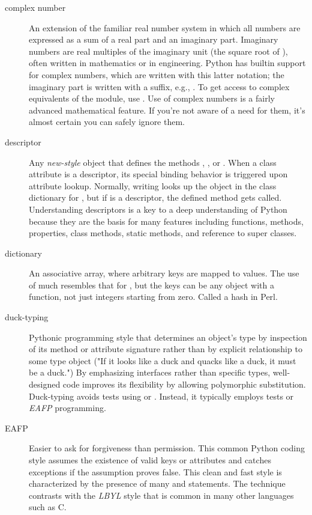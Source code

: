 \begin{description}
\item[complex number]
An extension of the familiar real number system in which all numbers are
expressed as a sum of a real part and an imaginary part.  Imaginary numbers
are real multiples of the imaginary unit (the square root of {}),
often written {} in mathematics or {} in engineering.
Python has builtin support for complex numbers, which are written with this
latter notation; the imaginary part is written with a {} suffix,
e.g., {}.  To get access to complex equivalents of the
{} module, use {}.  Use of complex numbers is a
fairly advanced mathematical feature.  If you're not aware of a need for them,
it's almost certain you can safely ignore them.

\item[descriptor]
Any \emph{new-style} object that defines the methods
{}, , or .
When a class attribute is a descriptor, its special binding behavior
is triggered upon attribute lookup.  Normally, writing  looks
up the object  in the class dictionary for , but if
{} is a descriptor, the defined method gets called.
Understanding descriptors is a key to a deep understanding of Python
because they are the basis for many features including functions,
methods, properties, class methods, static methods, and reference to
super classes.

\item[dictionary]
An associative array, where arbitrary keys are mapped to values.  The
use of  much resembles that for , but the keys
can be any object with a  function, not just
integers starting from zero.  Called a hash in Perl.

\item[duck-typing]
Pythonic programming style that determines an object's type by inspection
of its method or attribute signature rather than by explicit relationship
to some type object ("If it looks like a duck and quacks like a duck, it
must be a duck.")  By emphasizing interfaces rather than specific types,
well-designed code improves its flexibility by allowing polymorphic
substitution.  Duck-typing avoids tests using  or
. Instead, it typically employs
 tests or {}\emph{EAFP} programming.

\item[EAFP]
Easier to ask for forgiveness than permission.  This common Python
coding style assumes the existence of valid keys or attributes and
catches exceptions if the assumption proves false.  This clean and
fast style is characterized by the presence of many  and
{} statements.  The technique contrasts with the
{}\emph{LBYL} style that is common in many other languages such as C.


\end{description}
